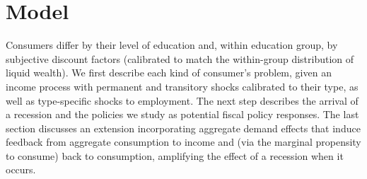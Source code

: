 \documentclass[\latexroot/\projectname]{subfiles}
\begin{document}
\whenintegrated{%
}

\section{Model}\whenintegrated{\label{model}}
\whenintegrated{\label{sec:model}} %

Consumers differ by their level of education and, within education group, by subjective discount factors (calibrated to match the within-group distribution of liquid wealth). We first describe each kind of consumer's problem, given an income process with permanent and transitory shocks calibrated to their type, as well as type-specific shocks to employment. The next step describes the arrival of a recession and the policies we study as potential fiscal policy responses. The last section discusses an extension incorporating aggregate demand effects that induce feedback from aggregate consumption to income and (via the marginal propensity to consume) back to consumption, amplifying the effect of a recession when it occurs.
\end{document}
